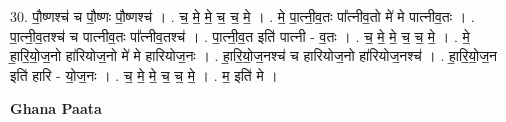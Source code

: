 \documentclass[17pt]{extarticle}
\begin{document}
30. पौ॒ष्णश्च॑ च पौ॒ष्णः पौ॒ष्णश्च॑ । . च॒ मे॒ मे॒ च॒ च॒ मे॒ । . मे॒ पा॒त्नी॒व॒तः पा᳚त्नीव॒तो मे॑ मे पात्नीव॒तः । . पा॒त्नी॒व॒तश्च॑ च पात्नीव॒तः पा᳚त्नीव॒तश्च॑ । . पा॒त्नी॒व॒त इति॑ पात्नी - व॒तः । . च॒ मे॒ मे॒ च॒ च॒ मे॒ । . मे॒ हा॒रि॒यो॒ज॒नो हा॑रियोज॒नो मे॑ मे हारियोज॒नः । . हा॒रि॒यो॒ज॒नश्च॑ च हारियोज॒नो हा॑रियोज॒नश्च॑ । . हा॒रि॒यो॒ज॒न इति॑ हारि - यो॒ज॒नः । . च॒ मे॒ मे॒ च॒ च॒ मे॒ । . म॒ इति॑ मे । \newline

\textbf{Ghana Paata } \newline
\end{document}
